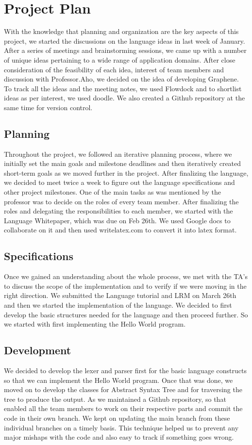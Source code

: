 \documentclass[a4paper]{article}
\begin{document}
\newpage
\section{Project Plan}
With the knowledge that planning and organization are the key aspects of this project, we started the discussions on the language ideas in last week of January. After a series of meetings and brainstorming sessions, we came up with a number of unique ideas pertaining to  a wide range of application domains. After close consideration of the feasibility of each idea, interest of team members and discussion with Professor.Aho, we decided on the idea of developing Graphene. To track all the ideas and the meeting notes, we used Flowdock and to shortlist ideas as per interest, we used doodle. We also created a Github repository at the same time for version control.

\subsection{Planning}
Throughout the project, we followed an iterative planning process, where we initially set the main goals and milestone deadlines and then iteratively created short-term goals as we moved further in the project. After finalizing the language, we decided to meet twice a week to figure out the language specifications and other project milestones. One of the main tasks as was mentioned by the professor was to decide on the roles of every team member. After finalizing the roles and delegating the responsibilities to each member, we started with the Language Whitepaper, which was due on Feb 26th. We used Google docs to collaborate on it and then used writelatex.com to convert it into latex format. 

\subsection{Specifications}
Once we gained an understanding about the whole process, we met with the TA’s to discuss the scope of the implementation and to verify if we were moving in the right direction. We submitted the Language tutorial and LRM on March 26th and then we started the implementation of the language. We decided to first develop the basic structures needed for the language and then proceed further. So we started with first implementing the Hello World program.

\subsection{Development}
We decided to develop the lexer and parser first for the basic language constructs so that we can implement the Hello World program. Once that was done, we moved on to develop the classes for Abstract Syntax Tree and for traversing the tree to produce the output. As we maintained a Github repository, so that enabled all the team members to work on their respective parts and commit the code in their own branch. We kept on updating the main branch from these individual branches on a timely basis. This technique helped us to prevent any major mishaps with the code and also easy to track if something goes wrong.
\end{document}
